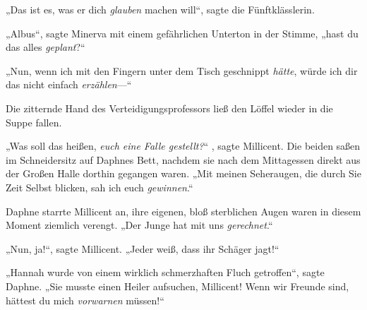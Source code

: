 „Das ist es, was er dich \emph{glauben} machen will“, sagte die Fünftklässlerin.

\later

„Albus“, sagte Minerva mit einem gefährlichen Unterton in der Stimme, „hast du das alles \emph{geplant}?“

\later

„Nun, wenn ich mit den Fingern unter dem Tisch geschnippt \emph{hätte}, würde ich dir das nicht einfach \emph{erzählen}—“

\later

Die zitternde Hand des Verteidigungsprofessors ließ den Löffel wieder in die Suppe fallen.

\later

„Was soll das heißen, \emph{euch eine Falle gestellt?}“ , sagte Millicent. Die beiden saßen im Schneidersitz auf Daphnes Bett, nachdem sie nach dem Mittagessen direkt aus der Großen Halle dorthin gegangen waren. „Mit meinen Seheraugen, die durch Sie Zeit Selbst blicken, sah ich euch \emph{gewinnen}.“

Daphne starrte Millicent an, ihre eigenen, bloß sterblichen Augen waren in diesem Moment ziemlich verengt. „Der Junge hat mit uns \emph{gerechnet}.“

„Nun, ja!“, sagte Millicent. „Jeder weiß, dass ihr Schäger jagt!“

„Hannah wurde von einem wirklich schmerzhaften Fluch getroffen“, sagte Daphne. „Sie musste einen Heiler aufsuchen, Millicent! Wenn wir Freunde sind, hättest du mich \emph{vorwarnen} müssen!“


